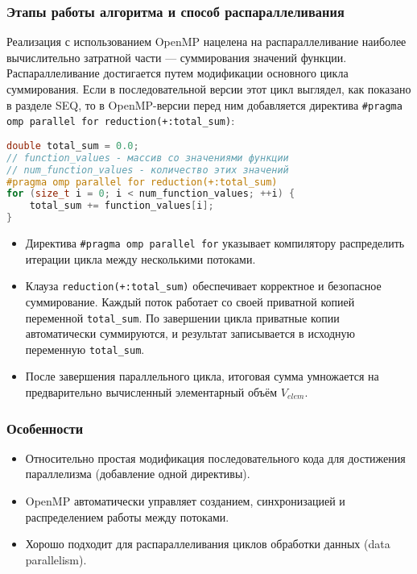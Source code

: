 \documentclass[12pt]{article}
\begin{document}
\subsubsection*{Этапы работы алгоритма и способ распараллеливания}
Реализация с использованием OpenMP нацелена на распараллеливание наиболее вычислительно затратной части — суммирования значений функции.
Распараллеливание достигается путем модификации основного цикла суммирования. Если в последовательной версии этот цикл выглядел, как показано в разделе SEQ, то в OpenMP-версии перед ним добавляется директива \texttt{\#pragma omp parallel for reduction(+:total\_sum)}:
\begin{lstlisting}[language=C++, basicstyle=\small\ttfamily, frame=none, numbers=none]
double total_sum = 0.0;
// function_values - массив со значениями функции
// num_function_values - количество этих значений
#pragma omp parallel for reduction(+:total_sum)
for (size_t i = 0; i < num_function_values; ++i) {
    total_sum += function_values[i];
}
\end{lstlisting}
\begin{itemize}
  \item Директива \texttt{\#pragma omp parallel for} указывает компилятору распределить итерации цикла между несколькими потоками.
  \item Клауза \texttt{reduction(+:total\_sum)} обеспечивает корректное и безопасное суммирование. Каждый поток работает со своей приватной копией переменной \texttt{total\_sum}. По завершении цикла приватные копии автоматически суммируются, и результат записывается в исходную переменную \texttt{total\_sum}.
  \item После завершения параллельного цикла, итоговая сумма умножается на предварительно вычисленный элементарный объём $V_{elem}$.
\end{itemize}

\subsubsection*{Особенности}
\begin{itemize}
  \item Относительно простая модификация последовательного кода для достижения параллелизма (добавление одной директивы).
  \item OpenMP автоматически управляет созданием, синхронизацией и распределением работы между потоками.
  \item Хорошо подходит для распараллеливания циклов обработки данных (data parallelism).
\end{itemize}
\end{document}
